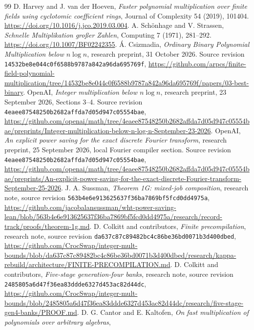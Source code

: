 \documentclass[11pt]{article}
\begin{document}
\clearpage
\begin{thebibliography}{99}
 D. Harvey and J. van der Hoeven,
\emph{Faster polynomial multiplication over finite fields using cyclotomic
coefficient rings}, Journal of Complexity 54 (2019), 101404.
\url{https://doi.org/10.1016/j.jco.2019.03.004}.
 A. Sch\"onhage and V. Strassen,
\emph{Schnelle Multiplikation gro\ss er Zahlen}, Computing 7 (1971), 281--292.
\url{https://doi.org/10.1007/BF02242355}.
 \'A. Csizmadia, \emph{Ordinary Binary Polynomial
Multiplication below $n\log n$}, research preprint, 31 October 2026.
Source revision \texttt{14532be8e044c0f6588b9787a842a96da695769f},
\url{https://github.com/arpcs/finite-field-polynomial-multiplication/tree/14532be8e044c0f6588b9787a842a96da695769f/papers/03-best-binary}.
 OpenAI, \emph{Integer multiplication below $n\log n$},
research preprint, 23 September 2026, Sections 3--4.
Source revision \texttt{4eaee87548250b2682affda7d05d947c05554bae},
\url{https://github.com/openai/math/tree/4eaee87548250b2682affda7d05d947c05554bae/preprints/Integer-multiplication-below-n-log-n-September-23-2026}.
 OpenAI, \emph{An explicit power saving for the exact
discrete Fourier transform}, research preprint, 25 September 2026,
local Fourier compiler section.
Source revision \texttt{4eaee87548250b2682affda7d05d947c05554bae},
\url{https://github.com/openai/math/tree/4eaee87548250b2682affda7d05d947c05554bae/preprints/An-explicit-power-saving-for-the-exact-discrete-Fourier-transform-September-25-2026}.
 J. A. Sussman, \emph{Theorem 1G: mixed-job composition},
research note, source revision
\texttt{563b4e6e913625637f36ba7869bf5fcd0dd4975a},
\url{https://github.com/jacobalansussman/wht-power-saving-lean/blob/563b4e6e913625637f36ba7869bf5fcd0dd4975a/research/record-track/proofs/theorem-1g.md}.
 D. Colkitt and contributors,
\emph{Finite precompilation}, research note,
source revision \texttt{da637c87c89482bc4c86be36bd0071b3d400dbed},
\url{https://github.com/CrocSwap/integer-mult-bounds/blob/da637c87c89482bc4c86be36bd0071b3d400dbed/research/kappa-rebuild/architecture/FINITE-PRECOMPILATION.md}.
 D. Colkitt and contributors,
\emph{Five-stage generation-four banks}, research note,
source revision \texttt{2485805a6d47f36ea83ddde6327d453ac82d44dc},
\url{https://github.com/CrocSwap/integer-mult-bounds/blob/2485805a6d47f36ea83ddde6327d453ac82d44dc/research/five-stage-gen4-banks/PROOF.md}.
 D. G. Cantor and E. Kaltofen,
\emph{On fast multiplication of polynomials over arbitrary algebras},

\end{thebibliography}
\end{document}
